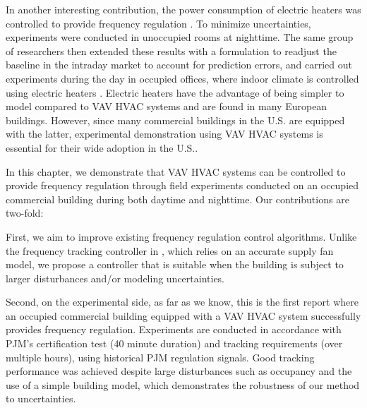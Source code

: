 In another interesting contribution, the power consumption of electric heaters was %
controlled to provide frequency regulation \cite{Fabietti:2016exp}. 
To minimize uncertainties, experiments were conducted in unoccupied rooms at nighttime.
The same group of researchers then extended these results with a formulation to readjust the baseline in the intraday market to account for prediction errors, and carried out experiments during the day in occupied offices, where indoor climate is controlled using electric heaters \cite{Gorecki:2017exp}.
Electric heaters have the advantage of being simpler to model compared to VAV HVAC systems and are found in many European buildings.
However, since many commercial buildings in the U.S. are equipped with the latter, experimental demonstration using VAV HVAC systems is essential for their wide adoption in the U.S..


In this chapter, we demonstrate that VAV HVAC systems can be controlled to provide frequency regulation through field experiments conducted on an occupied commercial building during both daytime and nighttime.
Our contributions are two-fold:


First, we aim to improve existing frequency regulation control algorithms.
Unlike the frequency tracking controller in \cite{Vrettos:2016flexlab1}, which relies on an accurate supply fan model, we propose a controller that is suitable when the building is subject to larger disturbances and/or modeling uncertainties. 

Second, on the experimental side, as far as we know, this is the first report where an occupied commercial building equipped with a VAV HVAC system successfully provides frequency regulation.
Experiments are conducted in accordance with PJM's certification test (40 minute duration) and tracking requirements (over multiple hours), using historical PJM regulation signals.  
Good tracking performance was achieved despite large disturbances such as occupancy and the use of a simple building model, which demonstrates the robustness of our method to uncertainties.

